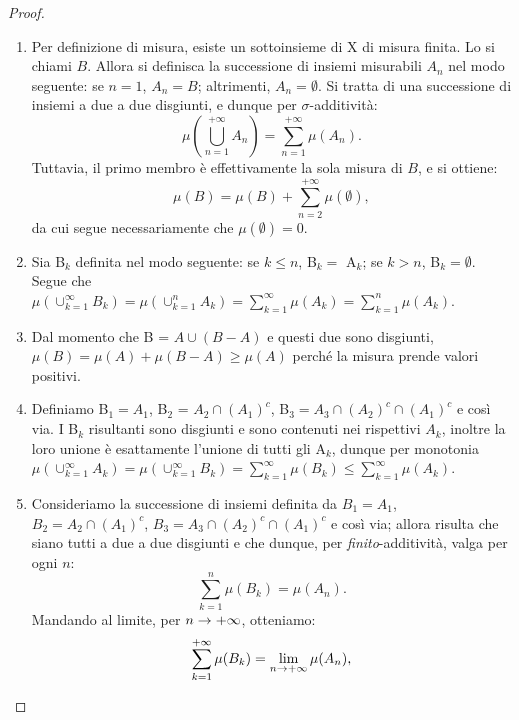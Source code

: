 \documentclass[Completo.tex]{subfiles}
\begin{document}
\begin{proof}
	\begin{enumerate}
		\item Per definizione di misura, esiste un sottoinsieme di X di misura finita. Lo si chiami $B$. Allora si definisca la successione di insiemi misurabili $A_n$ nel modo seguente: se $n = 1$, $A_n = B$; altrimenti, $A_n = \emptyset$. Si tratta di una successione di insiemi a due a due disgiunti, e dunque per $\sigma$-additività:
		\begin{equation*}
		\mu\left(\bigcup_{n =1}^{+\infty} A_n\right) = \sum_{n = 1}^{+\infty} \mu(A_n).
		\end{equation*}
		Tuttavia, il primo membro è effettivamente la sola misura di $B$, e si ottiene:
		\begin{equation*}
		\mu(B) = \mu(B) + \sum_{n=2}^{+\infty} \mu(\emptyset),
		\end{equation*}
		da cui segue necessariamente che $\mu(\emptyset) = 0$.
		\item Sia B$_k$ definita nel modo seguente: se $k \leq n$, B$_k =$ A$_k$; se $k > n$, B$_k = \emptyset$. Segue che $\mu(\cup_{k=1}^{\infty} B_k) = \mu(\cup_{k=1}^{n} A_k)= \sum_{k=1}^{\infty} \mu(A_k) = \sum_{k=1}^{n} \mu(A_k)$.
		\item Dal momento che B = $ A \cup (B-A)$ e questi due sono disgiunti, $\mu(B) = \mu(A) + \mu(B-A) \geq \mu(A)$ perché la misura prende valori positivi.
		\item Definiamo B$_1 = A_1$, B$_2$ = $A_2 \cap (A_1)^{c}$, B$_3 = A_3 \cap (A_2)^{c} \cap (A_1)^{c}$ e così via. I B$_k$ risultanti sono disgiunti e sono contenuti nei rispettivi $A_k$, inoltre la loro unione è esattamente l'unione di tutti gli A$_k$, dunque per monotonia $\mu(\cup_{k=1}^{\infty}A_k) = \mu(\cup_{k=1}^{\infty} B_k) = \sum_{k=1}^{\infty} \mu(B_k) \leq \sum_{k=1}^{\infty} \mu(A_k)$.
		\item Consideriamo la successione di insiemi definita da $B_1 = A_1$, $B_2 = A_2 \cap (A_1)^{c}$, $B_3 = A_3 \cap (A_2)^{c} \cap (A_1)^{c}$ e così via; allora risulta che siano tutti a due a due disgiunti e che dunque, per \textit{finito}-additività, valga per ogni $n$:
		\begin{equation*}
		\sum_{k=1}^{n} \mu(B_k) = \mu(A_n).
		\end{equation*}
		Mandando al limite, per $n \rightarrow +\infty$, otteniamo:
		\begin{equation*}
		\sum_{k=1}^{+\infty} \mu(B_k) = \lim_{n \rightarrow +\infty} \mu(A_n),
		\end{equation*}

\end{enumerate}
\end{proof}
\end{document}
